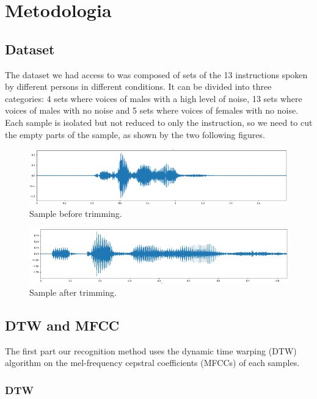 \documentclass[%
  report,%
  10pt,%
  a4paper,%
  fleqn,%
  oneside,%
  sumario = tradicional,%
  chapter = TITLE,%
  section = TITLE,%
]{abntex2}
\begin{document}
\section{Metodologia}\label{sec:met}

\subsection{Dataset}

The dataset we had access to was composed of sets of the 13 instructions spoken by different persons in different conditions.
It can be divided into three categories: 4 sets where voices of males with a high level of noise, 13 sets where voices of males with no noise and 5 sets where voices of females with no noise.
Each sample is isolated but not reduced to only the instruction, so we need to cut the empty parts of the sample, as shown by the two following figures.

\begin{figure}[H]
  \centering
  \caption{Sample before trimming.}
  \label{fig:sample_1}
  \includegraphics[width = 0.5\columnwidth]{./Figuras/sample_1}
\end{figure}

\begin{figure}[H]
  \centering
  \caption{Sample after trimming.}
  \label{fig:sample_2}
  \includegraphics[width = 0.5\columnwidth]{./Figuras/sample_2}
\end{figure}

\subsection{DTW and MFCC}

The first part our recognition method uses the dynamic time warping (DTW) algorithm on the mel-frequency cepstral coefficients (MFCCs) of each samples.

\subsubsection{DTW}
\end{document}
